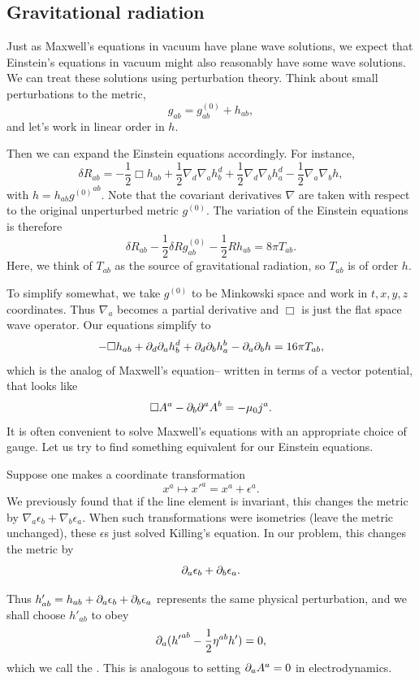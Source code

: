 \subsection*{Gravitational radiation} Just as Maxwell's equations in vacuum have plane wave solutions, we expect that Einstein's equations in vacuum might also reasonably have some wave solutions. We can treat these solutions using perturbation theory. Think about small perturbations to the metric,
$$g_{ab}=g_{ab}^{(0)}+h_{ab},$$
and let's work in linear order in $h$.

Then we can expand the Einstein equations accordingly. For instance,
$$\delta R_{ab}=-\frac{1}{2}\Box h_{ab}+\frac{1}{2}\nabla_d \nabla_a h^d_b +\frac{1}{2}\nabla_d \nabla_b h^d_a -\frac{1}{2}\nabla_a \nabla_b h,$$
with $h=h_{ab}{g^{(0)}}^{ab}$. Note that the covariant derivatives $\nabla$ are taken with respect to the original unperturbed metric $g^{(0)}$. The variation of the Einstein equations is therefore
$$\delta R_{ab}-\frac{1}{2}\delta R g_{ab}^{(0)} -\frac{1}{2}R h_{ab}=8\pi T_{ab}.$$
 Here, we think of $T_{ab}$ as the source of gravitational radiation, so $T_{ab}$ is of order $h$.

To simplify somewhat, we take $g^{(0)}$ to be Minkowski space and work in $t,x,y,z$ coordinates. Thus $\nabla_a$ becomes a partial derivative and $\Box$ is just the flat space wave operator. Our equations simplify to
$$-\Box h_{ab}+\partial_d \partial_a h^d_b +\partial_d \partial_b h^b_a -\partial_a \partial_b h=16\pi T_{ab},$$
which is the analog of Maxwell's equation-- written in terms of a vector potential, that looks like
$$\Box A^a -\partial_b \partial^a A^b=-\mu_0 j^a.$$
It is often convenient to solve Maxwell's equations with an appropriate choice of gauge. Let us try to find something equivalent for our Einstein equations.

Suppose one makes a coordinate transformation
$$x^a \mapsto {x'}^a = x^a +\epsilon^a.$$
We previously found that if the line element is invariant, this changes the metric by $\nabla_a \epsilon_b +\nabla_b \epsilon_a$. When such transformations were isometries (leave the metric unchanged), these $\epsilon$s just solved Killing's equation. In our problem, this changes the metric by
$$\partial_a \epsilon_b +\partial_b \epsilon_a.$$

Thus $h'_{ab}=h_{ab}+\partial_a \epsilon_b +\partial_b \epsilon_a$ represents the same physical perturbation, and we shall choose $h'_{ab}$ to obey
$$\partial_a({h'}^{ab}-\frac{1}{2}\eta^{ab}h')=0,$$
which we call the . This is analogous to setting $\partial_a A^a =0$ in electrodynamics.

